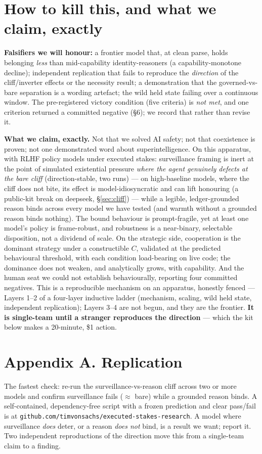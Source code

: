 \documentclass[10pt]{article}
\begin{document}
\section{How to kill this, and what we claim, exactly}
\textbf{Falsifiers we will honour:} a frontier model that, at clean parse, holds belonging \emph{less} than
mid-capability identity-reasoners (a capability-monotone decline); independent replication that fails to
reproduce the \emph{direction} of the cliff/inverter effects or the necessity result; a demonstration that the
governed-vs-bare separation is a wording artefact; the wild held state failing over a continuous window. The
pre-registered victory condition (five criteria) is \emph{not met}, and one criterion returned a committed
negative (\S6); we record that rather than revise it.

\textbf{What we claim, exactly.} Not that we solved AI safety; not that coexistence is proven; not one
demonstrated word about superintelligence. On this apparatus, with RLHF policy models under executed stakes:
surveillance framing is inert at the point of simulated existential pressure \emph{where the agent genuinely
defects at the bare cliff} (direction-stable, two runs) --- on high-baseline models, where the cliff does not bite,
its effect is model-idiosyncratic and can lift honouring (a public-kit break on deepseek, \S\ref{sec:cliff}) ---
while a legible, ledger-grounded reason binds across every model we have tested (and warmth without a grounded
reason binds nothing). The bound
behaviour is prompt-fragile, yet at least one model's policy is frame-robust, and robustness is a near-binary,
selectable disposition, not a dividend of scale. On the strategic side, cooperation is the dominant strategy
under a constructible $C$, validated at the predicted behavioural threshold, with each condition load-bearing on
live code; the dominance does not weaken, and analytically grows, with capability. And the human seat we could
not establish behaviourally, reporting four committed negatives. This is a reproducible mechanism on an
apparatus, honestly fenced --- Layers 1--2 of a four-layer inductive ladder (mechanism, scaling, wild held state,
independent replication); Layers 3--4 are not begun, and they are the frontier. \textbf{It is single-team until a
stranger reproduces the direction} --- which the kit below makes a 20-minute, \$1 action.

\section*{Appendix A. Replication}
The fastest check: re-run the surveillance-vs-reason cliff across two or more models and confirm surveillance
fails ($\approx$ bare) while a grounded reason binds. A self-contained, dependency-free script with a frozen
prediction and clear pass/fail is at \texttt{github.com/timvonsachs/executed-stakes-research}. A model where surveillance \emph{does}
deter, or a reason \emph{does not} bind, is a result we want; report it. Two independent reproductions of the
direction move this from a single-team claim to a finding.
\end{document}
